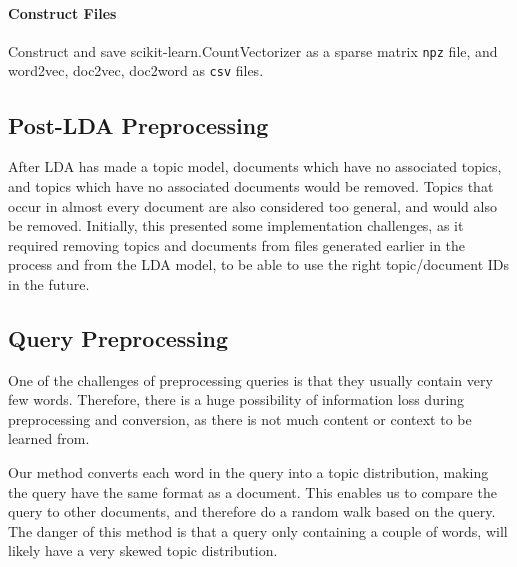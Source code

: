 \paragraph{Construct Files}
Construct and save scikit-learn.CountVectorizer as a sparse matrix \texttt{npz} file, and word2vec, doc2vec, doc2word as \texttt{csv} files.


\subsection{Post-LDA Preprocessing}
After LDA has made a topic model, documents which have no associated topics, and topics which have no associated documents would be removed.
Topics that occur in almost every document are also considered too general, and would also be removed.
Initially, this presented some implementation challenges, as it required removing topics and documents from files generated earlier in the process and from the LDA model, to be able to use the right topic/document IDs in the future.

\subsection{Query Preprocessing}
One of the challenges of preprocessing queries is that they usually contain very few words.
Therefore, there is a huge possibility of information loss during preprocessing and conversion, as there is not much content or context to be learned from.

Our method converts each word in the query into a topic distribution, making the query have the same format as a document. 
This enables us to compare the query to other documents, and therefore do a random walk based on the query.
The danger of this method is that a query only containing a couple of words, will likely have a very skewed topic distribution.
